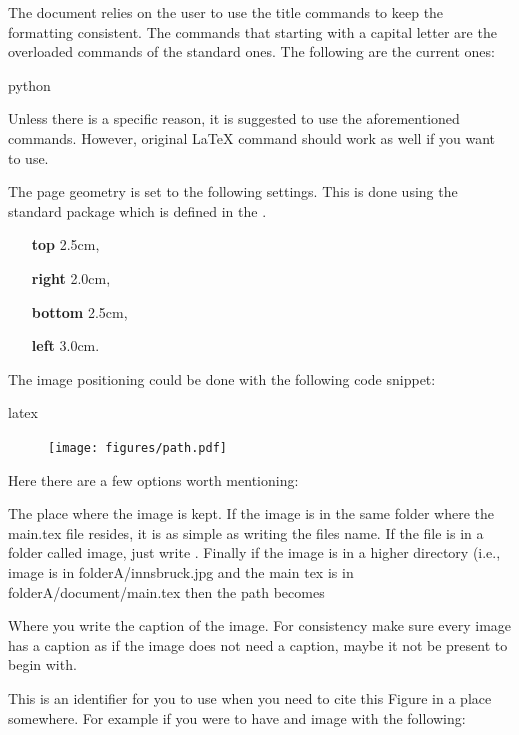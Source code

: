 \documentclass[minted, draw]{../tex/hebdomon}
\begin{document}
The document relies on the user to use the  title commands to
keep the formatting consistent. The commands that starting with a
capital letter are the overloaded commands of the standard ones.
The following are the current ones:
%
\begin{code}{python}
\end{code}
%
\begin{warning}
	Unless there is a specific reason, it is suggested to use the aforementioned
	commands. However, original LaTeX command should work as well if you want to use.
\end{warning}


The page geometry is set to the following settings. This is done using the
standard package \pcode{\usepackage{geometry}} which is defined in the
.
%
\begin{itemize}[leftmargin=!,labelindent=-29.2pt]
	\item[\textbf{top}] 2.5cm,
	\item[\textbf{right}] 2.0cm,
	\item[\textbf{bottom}] 2.5cm,
	\item[\textbf{left}] 3.0cm.
\end{itemize}
%
%
The image positioning could be done with the following code snippet:
%
\begin{code}{latex}
\begin{figure}[ht]
  \centering
  \texttt{[image: figures/path.pdf]}
  \caption{\label{fig:label} }
\end{figure}
\end{code}
%
Here there are a few options worth mentioning:
%
\begin{hgitemize}
	\item[\pcode{figures/path}] The place where the image is kept. If the
	image is in the same folder where the main.tex file resides, it is as
	simple as writing the files name. If the file is in a folder called
	image, just write . Finally if the image is
	in a higher directory (i.e., image is in folderA/innsbruck.jpg and the
	main tex is in folderA/document/main.tex then the path becomes 
	\item[\pcode{\caption{..}}] Where you write the caption of the image.
	For consistency make sure every image has a caption as if the image does not
	need a caption, maybe it not be present to begin with.
	\item[\pcode{label{}}] This is an identifier for you to use when you need
	to cite this Figure in a place somewhere. For example if you were to have
	and image with the following:
\end{hgitemize}
\end{document}
